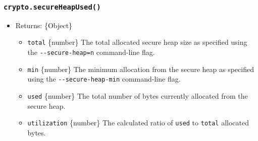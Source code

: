 \begin{Shaded}
\begin{Highlighting}[]
\NormalTok{ \{}
\OperatorTok{,}
\NormalTok{\} }\OperatorTok{=} \NormalTok{(}\NormalTok{)}\OperatorTok{;}

\OperatorTok{=} \NormalTok{(}\OperatorTok{,} \OperatorTok{,} \NormalTok{)}\OperatorTok{;}
\NormalTok{(}\NormalTok{))}\OperatorTok{;}  
\OperatorTok{=} \NormalTok{(}\OperatorTok{,} \OperatorTok{,} \OperatorTok{,}\NormalTok{ \{ }\OperatorTok{:} \NormalTok{ \})}\OperatorTok{;}
\NormalTok{(}\NormalTok{))}\OperatorTok{;}  
\end{Highlighting}
\end{Shaded}

\subsubsection{\texorpdfstring{\texttt{crypto.secureHeapUsed()}}{crypto.secureHeapUsed()}}\label{crypto.secureheapused}

\begin{itemize}
\tightlist
\item
  Returns: \{Object\}

  \begin{itemize}
  \tightlist
  \item
    \texttt{total} \{number\} The total allocated secure heap size as
    specified using the \texttt{-\/-secure-heap=n} command-line flag.
  \item
    \texttt{min} \{number\} The minimum allocation from the secure heap
    as specified using the \texttt{-\/-secure-heap-min} command-line
    flag.
  \item
    \texttt{used} \{number\} The total number of bytes currently
    allocated from the secure heap.
  \item
    \texttt{utilization} \{number\} The calculated ratio of
    \texttt{used} to \texttt{total} allocated bytes.
  \end{itemize}
\end{itemize}

